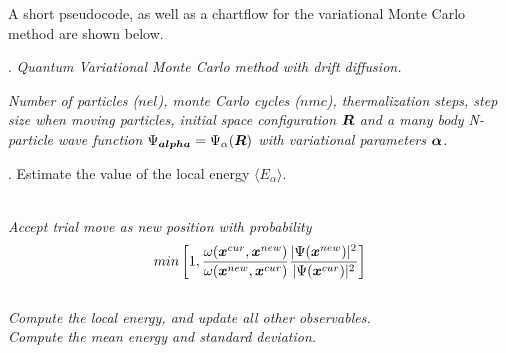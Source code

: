 A short pseudocode, as well as a chartflow for the variational Monte Carlo method are shown below.

\begin{program}
\caption{. \emph{Quantum Variational Monte Carlo method with drift diffusion.}}
\begin{algorithmic}%
\medskip
\REQUIRE \emph{Number of particles ($nel$), monte Carlo cycles ($nmc$), thermalization steps, step size when moving particles, initial space configuration $\boldsymbol{R}$ and a many body N-particle wave function $\Psi_{\boldsymbol{alpha}} = \Psi_{\alpha}(\boldsymbol{R})$ with variational parameters $\boldsymbol{\alpha}$. }

         .
\ENSURE Estimate the value of the local energy $\langle E_{\alpha} \rangle$.

\medskip
{} 
\medskip

     \medskip
     \\
     \emph{Accept trial move as new position with probability}\\
     $$min\left[1, \frac{\omega(\boldsymbol{x}^{cur}, \boldsymbol{x}^{new})}{\omega(\boldsymbol{x}^{new}, \boldsymbol{x}^{cur})} \frac{|\Psi(\boldsymbol{x}^{new})|^2}{|\Psi(\boldsymbol{x}^{cur})|^2}\right]$$
  \ENDFOR
  \\
  \emph{Compute the local energy, and update all other observables.}
\ENDFOR
\\
 \emph{Compute the mean energy and standard deviation.}
\end{algorithmic}\label{RSDalgo}
\end{program}



